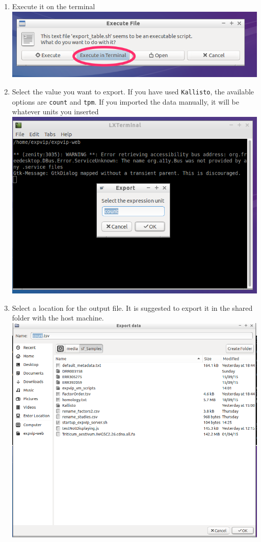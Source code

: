 \begin{enumerate}
\item
  Execute it on the terminal \includegraphics{images/ExportData02.png}
\item
  Select the value you want to export. If you have used
  \lstinline!Kallisto!, the available options are \lstinline!count! and
  \lstinline!tpm!. If you imported the data manually, it will be
  whatever units you inserted \includegraphics{images/ExportData03.png}
\item
  Select a location for the output file. It is suggested to export it in
  the shared folder with the host machine.
  \includegraphics{images/ExportData04.png}
\end{enumerate}

